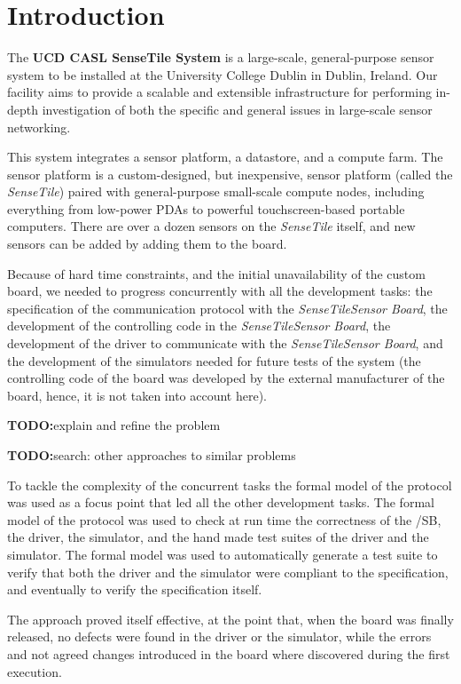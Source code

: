 \documentclass{article}
\newcommand{\todo}{\textbf{TODO:}}
\newcommand{\ST}{\emph{SenseTile}\xspace}
\newcommand{\STSB}{\ST \emph{Sensor Board}\xspace}
\begin{document}
\section{Introduction}

The \textbf{UCD CASL SenseTile System} is a large-scale, general-purpose
sensor system to be installed at the University College Dublin in Dublin,
Ireland. 
Our facility aims to provide a scalable and extensible 
infrastructure for performing in-depth investigation of both the specific 
and general issues in large-scale sensor networking.

This system integrates a sensor platform, a datastore, and a compute
farm.  
The sensor platform is a custom-designed, but inexpensive,
sensor platform (called the \ST) paired with general-purpose
small-scale compute nodes, including everything from low-power PDAs to
powerful touchscreen-based portable computers. 
There are over a dozen
sensors on the \ST itself, and new sensors can be added by adding them
to the board.

Because of hard time constraints, and the initial unavailability of the 
custom board, we needed to progress concurrently with all the development tasks: 
the specification of the communication protocol with the \STSB, the development of 
the controlling code in the \STSB, the development of the driver to communicate 
with the \STSB, and the development of the simulators needed for future tests 
of the system (the controlling code of the board was developed by the external 
manufacturer of the board, hence, it is not taken into account here).

\todo explain and refine the problem

\todo search: other approaches to similar problems

To tackle the complexity of the concurrent tasks the formal model of the protocol 
was used as a focus point that led all the other development tasks. 
The formal model of the protocol was used to check at run time the correctness of 
the /SB, the driver, the simulator, and the hand made test suites of the driver 
and the simulator.
The formal model was used to automatically generate a test suite to verify that
both the driver and the simulator were compliant to the specification, and eventually 
to verify the specification itself.

The approach proved itself effective, at the point that, when the board was finally 
released, no defects were found in the driver or the simulator, while the errors and 
not agreed changes introduced in the board where discovered during the first execution.
\end{document}
